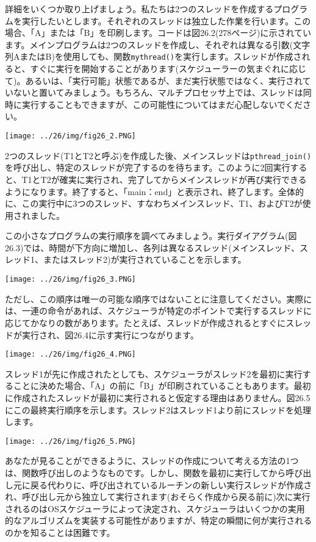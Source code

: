 詳細をいくつか取り上げましょう。私たちは2つのスレッドを作成するプログラムを実行したいとします。それぞれのスレッドは独立した作業を行います。この場合、「A」または「B」を印刷します。コードは図26.2(278ページ)に示されています。メインプログラムは2つのスレッドを作成し、それぞれは異なる引数(文字列AまたはB)を使用しても、関数\texttt{mythread()}を実行します。スレッドが作成されると、すぐに実行を開始することがあります(スケジューラーの気まぐれに応じて)。あるいは、「実行可能」状態であるが、まだ実行状態ではなく、実行されていないと置いてみましょう。もちろん、マルチプロセッサ上では、スレッドは同時に実行することもできますが、この可能性についてはまだ心配しないでください。

\texttt{[image: ../26/img/fig26\_2.PNG]}

2つのスレッド(T1とT2と呼ぶ)を作成した後、メインスレッドは\texttt{pthread\_join()}を呼び出し、特定のスレッドが完了するのを待ちます。このように2回実行すると、T1とT2が確実に実行され、完了してからメインスレッドが再び実行できるようになります。終了すると、「main：end」と表示され、終了します。全体的に、この実行中に3つのスレッド、すなわちメインスレッド、T1、およびT2が使用されました。

この小さなプログラムの実行順序を調べてみましょう。実行ダイアグラム(図26.3)では、時間が下方向に増加し、各列は異なるスレッド(メインスレッド、スレッド1、またはスレッド2)が実行されていることを示します。

\texttt{[image: ../26/img/fig26\_3.PNG]}

ただし、この順序は唯一の可能な順序ではないことに注意してください。実際には、一連の命令があれば、スケジューラが特定のポイントで実行するスレッドに応じてかなりの数があります。たとえば、スレッドが作成されるとすぐにスレッドが実行され、図26.4に示す実行につながります。

\texttt{[image: ../26/img/fig26\_4.PNG]}

スレッド1が先に作成されたとしても、スケジューラがスレッド2を最初に実行することに決めた場合、「A」の前に「B」が印刷されていることもあります。最初に作成されたスレッドが最初に実行されると仮定する理由はありません。図26.5にこの最終実行順序を示します。スレッド2はスレッド1より前にスレッドを処理します。

\texttt{[image: ../26/img/fig26\_5.PNG]}

あなたが見ることができるように、スレッドの作成について考える方法の1つは、関数呼び出しのようなものです。しかし、関数を最初に実行してから呼び出し元に戻る代わりに、呼び出されているルーチンの新しい実行スレッドが作成され、呼び出し元から独立して実行されます(おそらく作成から戻る前に)次に実行されるのはOSスケジューラによって決定され、スケジューラはいくつかの実用的なアルゴリズムを実装する可能性がありますが、特定の瞬間に何が実行されるのかを知ることは困難です。

